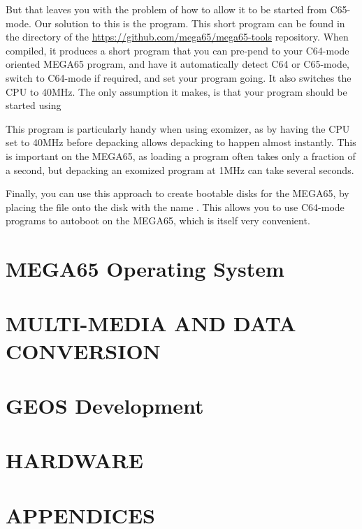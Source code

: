 But that leaves
you with the problem of how to allow it to be started from C65-mode.
Our solution to this is the  program.  This
short program can be found in the  directory of
the \url{https://github.com/mega65/mega65-tools} repository.  When
compiled, it produces a short program that you can pre-pend to your
C64-mode oriented MEGA65 program, and have it automatically detect
C64 or C65-mode, switch to C64-mode if required, and set your
program going. It also switches the CPU to 40MHz.  The only
assumption it makes, is that your program should be started using

This program is particularly handy when using exomizer, as by having
the CPU set to 40MHz before depacking allows depacking to happen
almost instantly.  This is important on the MEGA65, as loading a
program often takes only a fraction of a second, but depacking an
exomized program at 1MHz can take several seconds.

Finally, you can use this approach to create bootable disks for the
MEGA65, by placing the file onto the disk with the
name .  This allows you to use C64-mode programs
to autoboot on the MEGA65, which is itself very convenient.

\part{MEGA65 Operating System}



{}

\part{MULTI-MEDIA AND DATA CONVERSION}

\part{GEOS Development}

\part{HARDWARE}



\part{APPENDICES}

\appendix
  
  
  
  


\nocite{*}



\printindex



